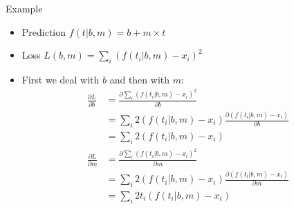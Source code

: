 \documentclass[aspectratio=169]{beamer}
\begin{document}
\begin{frame}{Example}

	\begin{itemize}
	\item Prediction $f(t | b, m) = b + m \times t$
	\item Loss $L(b, m) = \sum_i \left(f(t_i | b, m) - x_i \right)^2$
	\end{itemize}
\begin{itemize}
\item First we deal with $b$ and then with $m$:
	\begin{align}
	\frac{\partial L}{\partial b} &= \frac{\partial \sum_i (f(t_i | b, m) - x_i) ^2}{\partial b} \nonumber \\
		 & = \sum_i 2(f(t_i | b, m) - x_i) \frac{\partial \left(f(t_i | b, m) - x_i \right)}{\partial b}  \nonumber \\
		&= \sum_i 2(f(t_i | b, m) - x_i) \nonumber \\
	\frac{\partial L}{\partial m} \nonumber &= \frac{\partial \sum_i (f(t_i | b, m) - x_i) ^2}{\partial m} \nonumber \\
		&= \sum_i 2(f(t_i | b, m) - x_i) \frac{\partial \left(f(t_i | b, m) - x_i \right)}{\partial m}  \nonumber \\
		&= \sum_i 2t_i(f(t_i | b, m) - x_i) \nonumber
	\end{align}
\end{itemize}

\end{frame}
\end{document}
